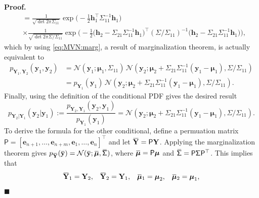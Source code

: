 \documentclass[10pt]{article}
\theoremstyle{definition}
\newenvironment{prf}{\noindent\textbf{Proof.}}{\hfill$\blacksquare$}
\newcommand{\overbar}[1]{\mkern 1.5mu\overline{\mkern-1.5mu#1\mkern-1.5mu}\mkern 1.5mu}
\begin{document}
\begin{prf}
\begin{align*}
&= \frac{1}{\sqrt{\det 2 \pi \mathsf{\Sigma}_{11}}} 
\exp\Big(-\frac{1}{2}\mathbf{h}_1^{\top}\mathsf{\Sigma}_{11}^{-1}\mathbf{h}_1\Big) \\
&\times \frac{1}{\sqrt{\det 2 \pi \mathsf{\Sigma}/\mathsf{\Sigma}_{11}}} 
\exp\Big(-\frac{1}{2} \big(\mathbf{h}_2-\mathsf{\Sigma}_{21}\mathsf{\Sigma}_{11}^{-1}\mathbf{h}_1\big)^{\top}
(\mathsf{\Sigma}/\mathsf{\Sigma}_{11})^{-1}
\big(\mathbf{h}_2-\mathsf{\Sigma}_{21}\mathsf{\Sigma}_{11}^{-1}\mathbf{h}_1\big)\Big),
\end{align*}
which by using \cref{eq:MVN:marg}, a result of marginalization theorem, is actually equivalent to
\begin{align*}
p_{\mathbf{Y}_1,\mathbf{Y}_2}(\mathbf{y}_1,\mathbf{y}_2) &= 
\mathcal{N}(\mathbf{y}_1; \boldsymbol{\mu}_1, \mathsf{\Sigma}_{11}) \,
\mathcal{N}(\mathbf{y}_2; \boldsymbol{\mu}_2 + \mathsf{\Sigma}_{21}\mathsf{\Sigma}_{11}^{-1}(\mathbf{y}_1 - \boldsymbol{\mu}_1), 
\mathsf{\Sigma}/\mathsf{\Sigma}_{11}) \\
&= p_{\mathbf{Y}_1}(\mathbf{y}_1) \, \mathcal{N}(\mathbf{y}_2; \boldsymbol{\mu}_2 + \mathsf{\Sigma}_{21}\mathsf{\Sigma}_{11}^{-1}(\mathbf{y}_1 - \boldsymbol{\mu}_1), \mathsf{\Sigma}/\mathsf{\Sigma}_{11}) .
\end{align*}
Finally, using the definition of the conditional PDF gives the desired result
\begin{equation*}
p_{\mathbf{Y}_2|\mathbf{Y}_1}(\mathbf{y}_2|\mathbf{y}_1) := 
\frac{p_{\mathbf{Y}_2,\mathbf{Y}_1}(\mathbf{y}_2,\mathbf{y}_1)}{p_{\mathbf{Y}_1}(\mathbf{y}_1)} = \mathcal{N}(\mathbf{y}_2; \boldsymbol{\mu}_2 + \mathsf{\Sigma}_{21}\mathsf{\Sigma}_{11}^{-1}(\mathbf{y}_1 - \boldsymbol{\mu}_1), \mathsf{\Sigma}/\mathsf{\Sigma}_{11}) .
\end{equation*}
To derive the formula for the other conditional, define a permuation matrix $\mathsf{P}=[\mathbf{e}_{n+1},\dots,\mathbf{e}_{n+m},\mathbf{e}_1,\dots,\mathbf{e}_{n}]^{\top}$ and let $\overbar{\mathbf{Y}} = \mathsf{P}\mathbf{Y}$. Applying the marginalization theorem gives $p_{\overbar{\mathbf{Y}}}(\overbar{\mathbf{y}}) = \mathcal{N}(\overbar{\mathbf{y}}; \overbar{\boldsymbol{\mu}}, \overbar{\mathsf{\Sigma}})$, where $\overbar{\boldsymbol{\mu}} = \mathsf{P}\boldsymbol{\mu}$ and $\overbar{\mathsf{\Sigma}} = \mathsf{P}\mathsf{\Sigma}\mathsf{P}^{\top}$. This implies that
\begin{equation*}
\begin{array}{cccc}
\overbar{\mathbf{Y}}_1 = \mathbf{Y}_2, & \overbar{\mathbf{Y}}_2 = \mathbf{Y}_1, &
\overbar{\boldsymbol{\mu}}_1 = \mathbf{\boldsymbol{\mu}}_2, &  \overbar{\mathbf{\boldsymbol{\mu}}}_2 = \mathbf{\boldsymbol{\mu}}_1, \\

\end{array}
\end{equation*}
\end{prf}
\end{document}
